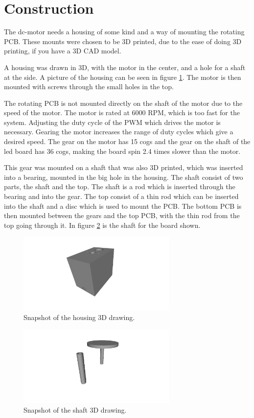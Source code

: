\section{Construction}
The dc-motor needs a housing of some kind and a way of mounting the rotating PCB.
These mounts were chosen to be 3D printed, due to the ease of doing 3D printing, if you have a 3D CAD model.

A housing was drawn in 3D, with the motor in the center, and a hole for a shaft at the side. 
A picture of the housing can be seen in figure \ref{fig:housing3D}.
The motor is then mounted with screws through the small holes in the top.

The rotating PCB is not mounted directly on the shaft of the motor due to the speed of the motor.
The motor is rated at 6000 RPM, which is too fast for the system.
Adjusting the duty cycle of the PWM which drives the motor is necessary.
Gearing the motor increases the range of duty cycles which give a desired speed.
The gear on the motor has 15 cogs and the gear on the shaft of the led board has 36 cogs, making the board spin 2.4 times slower than the motor.

This gear was mounted on a shaft that was also 3D printed, which was inserted into a bearing, mounted in the big hole in the housing.
The shaft consist of two parts, the shaft and the top.
The shaft is a rod which is inserted through the bearing and into the gear.
The top consist of a thin rod which can be inserted into the shaft and a disc which is used to mount the PCB.
The bottom PCB is then mounted between the gears and the top PCB, with the thin rod from the top going through it.
In figure \ref{fig:shaft3D} is the shaft for the board shown.

\begin{figure}[H]
 \centering
 \includegraphics[width=0.7\textwidth]{img/housing3D}
 \caption{Snapshot of the housing 3D drawing.}
 \label{fig:housing3D}
\end{figure}

\begin{figure}[H]
 \centering
 \includegraphics[width=0.7\textwidth]{img/shaft_3d}
 \caption{Snapshot of the shaft 3D drawing.}
 \label{fig:shaft3D}
\end{figure}

